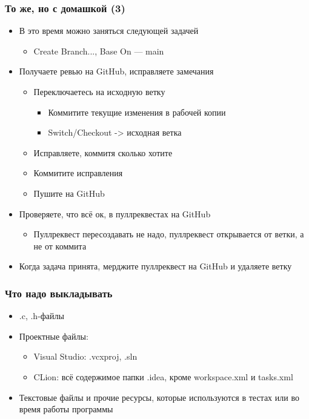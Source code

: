 \documentclass[xetex,mathserif,serif]{beamer}
\begin{document}
    \begin{frame}
        \frametitle{То же, но с домашкой (3)}
        \begin{itemize}
            \item В это время можно заняться следующей задачей
            \begin{itemize}
                \item Create Branch..., Base On --- main
            \end{itemize}
            \item Получаете ревью на GitHub, исправляете замечания
            \begin{itemize}
                \item Переключаетесь на исходную ветку
                \begin{itemize}
                    \item Коммитите текущие изменения в рабочей копии
                    \item Switch/Checkout -> исходная ветка
                \end{itemize}
                \item Исправляете, коммитя сколько хотите
                \item Коммитите исправления
                \item Пушите на GitHub
            \end{itemize}
            \item Проверяете, что всё ок, в пуллреквестах на GitHub
            \begin{itemize}
                \item Пуллреквест пересоздавать не надо, пуллреквест открывается от ветки, а не от коммита
            \end{itemize}
            \item Когда задача принята, мерджите пуллреквест на GitHub и удаляете ветку
        \end{itemize}
    \end{frame}

    \begin{frame}
        \frametitle{Что надо выкладывать}
        \begin{itemize}
            \item .c, .h-файлы
            \item Проектные файлы:
            \begin{itemize}
                \item Visual Studio: .vcxproj, .sln
                \item CLion: всё содержимое папки .idea, кроме workspace.xml и tasks.xml
            \end{itemize}
            \item Текстовые файлы и прочие ресурсы, которые используются в тестах или во время работы программы
        \end{itemize}
    \end{frame}
\end{document}
